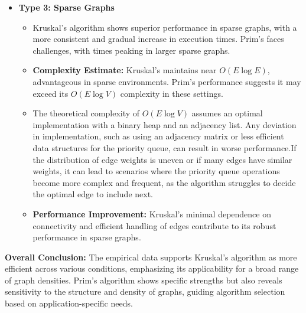 \documentclass{article}
\begin{document}
\begin{itemize}
    \item \textbf{Type 3: Sparse Graphs}
    \begin{itemize}
        \item Kruskal's algorithm shows superior performance in sparse graphs, with a more consistent and gradual increase in execution times. Prim’s faces challenges, with times peaking in larger sparse graphs.
        \item \textbf{Complexity Estimate:} Kruskal's maintains near \(O(E \log E)\), advantageous in sparse environments. Prim’s performance suggests it may exceed its \(O(E \log V)\) complexity in these settings.
        \item The theoretical complexity of $O(E \log V)$ assumes an optimal implementation with a binary heap and an adjacency list. Any deviation in implementation, such as using an adjacency matrix or less efficient data structures for the priority queue, can result in worse performance.If the distribution of edge weights is uneven or if many edges have similar weights, it can lead to scenarios where the priority queue operations become more complex and frequent, as the algorithm struggles to decide the optimal edge to include next.
        \item \textbf{Performance Improvement:} Kruskal’s minimal dependence on connectivity and efficient handling of edges contribute to its robust performance in sparse graphs.
    \end{itemize}
\end{itemize}

\textbf{Overall Conclusion:} The empirical data supports Kruskal's algorithm as more efficient across various conditions, emphasizing its applicability for a broad range of graph densities. Prim’s algorithm shows specific strengths but also reveals sensitivity to the structure and density of graphs, guiding algorithm selection based on application-specific needs.
\end{document}
